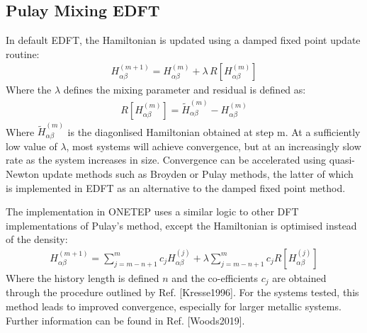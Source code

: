 \documentclass[letterpaper,10pt,english]{sphinxmanual}
\begin{document}
\subsection{Pulay Mixing EDFT}
\label{\detokenize{onetep_edft_documentation:pulay-mixing-edft}}
In default EDFT, the Hamiltonian is updated using a damped fixed point
update routine:
\begin{equation*}
\begin{split}\label{linearmixing}
     H_{\alpha\beta}^{(m+1)} = H_{\alpha\beta}^{(m)} + \lambda \,  R[H_{\alpha\beta}^{(m)}]\end{split}
\end{equation*}
Where the \(\lambda\) defines the mixing parameter and residual is
defined as:
\begin{equation*}
\begin{split}\label{residual}
    R[H_{\alpha\beta}^{(m)}] = \tilde{H}_{\alpha\beta}^{(m)} - H_{\alpha\beta}^{(m)}\end{split}
\end{equation*}
Where \(\tilde{H}_{\alpha\beta}^{(m)}\) is the diagonlised
Hamiltonian obtained at step m. At a sufficiently low value of
\(\lambda\), most systems will achieve convergence, but at an
increasingly slow rate as the system increases in size. Convergence can
be accelerated using quasi-Newton update methods such as Broyden or
Pulay methods, the latter of which is implemented in EDFT as an
alternative to the damped fixed point method.

The implementation in ONETEP uses a similar logic to other DFT
implementations of Pulay’s method, except the Hamiltonian is optimised
instead of the density:
\begin{equation*}
\begin{split}H_{\alpha\beta}^{(m+1)} =  \sum_{j=m-n+1}^{m} c_j H_{\alpha\beta}^{(j)} +  \lambda \sum_{j=m-n+1}^{m} c_j R[H_{\alpha\beta}^{(j)}]\end{split}
\end{equation*}
Where the history length is defined \(n\) and the co-efficients
\(c_j\) are obtained through the procedure outlined by Ref.
{[}Kresse1996{]}. For the systems tested, this method
leads to improved convergence, especially for larger metallic systems.
Further information can be found in Ref. {[}Woods2019{]}.
\end{document}
